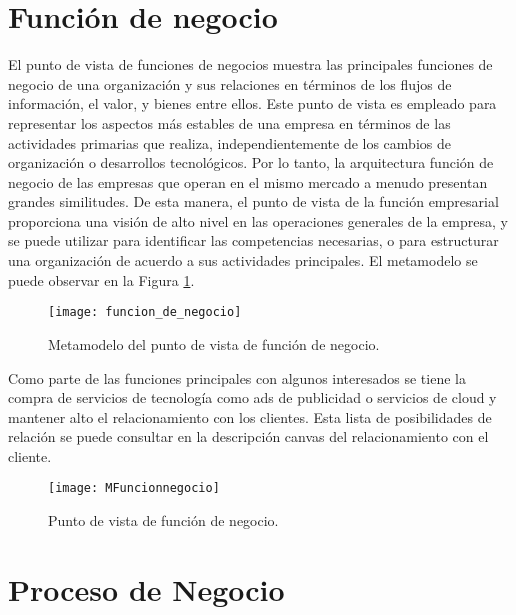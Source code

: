 \section{Función de negocio}

El punto de vista de funciones de negocios muestra las principales funciones de negocio de una organización y sus relaciones en términos de los flujos de información, el valor, y bienes entre ellos. Este punto de vista es empleado para representar los aspectos más estables de una empresa en términos de las actividades primarias que realiza, independientemente de los cambios de organización o desarrollos tecnológicos. Por lo tanto, la arquitectura función de negocio de las empresas que operan en el mismo mercado a menudo presentan grandes similitudes. De esta manera, el punto de vista de la función empresarial proporciona una visión de alto nivel en las operaciones generales de la empresa, y se puede utilizar para identificar las competencias necesarias, o para estructurar una organización de acuerdo a sus actividades principales. El metamodelo se puede observar en la Figura \ref{funcion_de_negocio}.

\begin{figure}[H]   
\centering
\texttt{[image: funcion\_de\_negocio]}
\caption{Metamodelo del punto de vista de función de negocio.}
\label{funcion_de_negocio}
\end{figure}

Como parte de las funciones principales con algunos interesados se tiene la compra de servicios de tecnología como ads de publicidad o servicios de cloud y mantener alto el relacionamiento con los clientes. Esta lista de posibilidades de relación se puede consultar en la descripción canvas del relacionamiento con el cliente.

\begin{figure}[H]   
\centering
\texttt{[image: MFuncionnegocio]}
\caption{Punto de vista de función de negocio.}
\label{MFuncionnegocio}
\end{figure}


\section{Proceso de Negocio}


